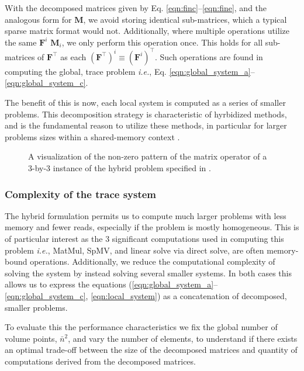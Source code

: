 %
%
%
\noindent
With the decomposed matrices given by Eq. \ref{eqn:finc}--\ref{eqn:fine}, and the analogous form for $\textbf{M}$, we avoid storing identical sub-matrices, which a typical sparse matrix format would not. 
Additionally, where multiple operations utilize the same $\textbf{F}^i$ $\textbf{M}_i$, we only perform this operation once. 
This holds for all sub-matrices of $\textbf{F}^\intercal$ as each $(\textbf{F}^\intercal)^i \equiv (\textbf{F}^i)^\intercal$.
Such operations are found in computing the global, trace problem \emph{i.e.}, Eq. \ref{eqn:global_system_a}--\ref{eqn:global_system_c}.

The benefit of this is now, each local system is computed as a series of smaller problems. 
This decomposition strategy is characteristic of hyrbidized methods, and is the fundamental reason to utilize these methods, in particular for larger problems sizes within a shared-memory context \citep{kozdon2021hybridized, kolev2021efficient, fernandez2017hybridized}. 

\begin{figure}[h]
	\centering
	
	\caption{A visualization of the non-zero pattern of the matrix operator of a 3-by-3 instance of the hybrid problem specified 
	in .}
	\label{fig:block_diagram}
\end{figure}



%
%
%
\subsubsection{Complexity of the trace system} 

The hybrid formulation permits us to compute much larger problems with less memory and fewer reads, especially if the problem is mostly homogeneous.
This is of particular interest as the 3 significant computations used in computing this problem \emph{i.e.}, MatMul, SpMV, and linear solve via direct solve, are often memory-bound operations. 
Additionally, we reduce the computational complexity of solving the system by instead solving several smaller systems. 
In both cases this allows us to express 
the equations (\ref{eqn:global_system_a}--\ref{eqn:global_system_c}, 
\ref{eqn:local_system}) as a concatenation of decomposed, smaller problems.

To evaluate this the performance characteristics we fix the global number of volume points, $\bar{n}^2$, and vary the number of elements, to understand if there exists an optimal trade-off between the size of the decomposed matrices and quantity of computations derived from the decomposed matrices.

